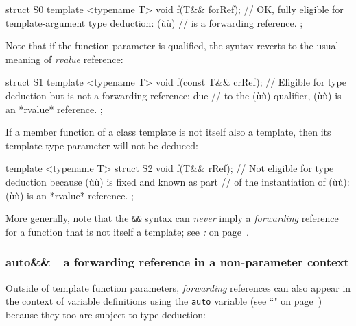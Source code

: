 \begin{emcppslisting}
struct S0
{
    template <typename T>
    void f(T&& forRef);
        // OK, fully eligible for template-argument type deduction: (ù{}ù)
        // is a forwarding reference.
};
\end{emcppslisting}

\noindent Note that if the function parameter is qualified, the syntax reverts to
the usual meaning of \emph{rvalue} reference:

\begin{emcppslisting}
struct S1
{
    template <typename T>
    void f(const T&& crRef);
        // Eligible for type deduction but is not a forwarding reference: due
        // to the (ù{}ù) qualifier, (ù{}ù) is an *rvalue* reference.
};
\end{emcppslisting}

\noindent If a member function of a class template is not itself also a template,
then its template type parameter will not be deduced:

\begin{emcppslisting}
template <typename T>
struct S2
{
    void f(T&& rRef);
       // Not eligible for type deduction because (ù{}ù) is fixed and known as part
       // of the instantiation of (ù{}ù): (ù{}ù) is an *rvalue* reference.
};
\end{emcppslisting}

\noindent More generally, note that the \texttt{\&\&} syntax can \emph{never}
imply a \emph{forwarding} reference for a function that is not itself a
template; see \textit{:
} on page~\pageref{forwarding-references-look-just-like-rvalue-references}.

\subsubsection[{\tt auto\&\&} --- a forwarding reference in a non-parameter context]{{\SubsubsecCode auto\&\&}~{\subsubemdash}~a forwarding reference in a non-parameter context}\label{auto-a-forwarding-reference-in-a-non-parameter-context}

Outside of template function parameters, \emph{forwarding} references
can also appear in the context of variable definitions using the
\texttt{auto} variable (see ``" on page~\pageref{auto-feature}) because they too are subject to type
deduction:

